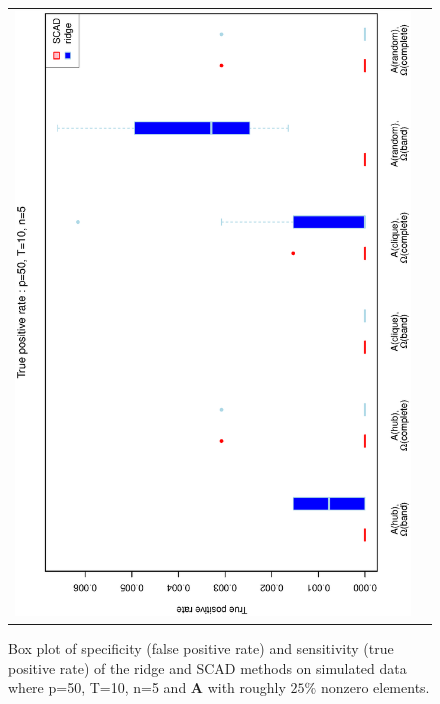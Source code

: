 \documentclass[a4paper]{article}
\begin{document}
\begin{figure}[h!]
\begin{tabular}{cc}
\includegraphics[scale=0.45,angle=270]{ROCtpr50T10N5_25.eps}
\end{tabular}
\caption{Box plot of specificity (false positive rate) and sensitivity (true positive rate) of the ridge and SCAD  methods on simulated data where p=50, T=10,  n=5 and $\mathbf{A}$ with roughly $25\%$ nonzero elements.}
\label{figSM:RocP50T10N5_25}
\end{figure}
\clearpage

\end{document}
